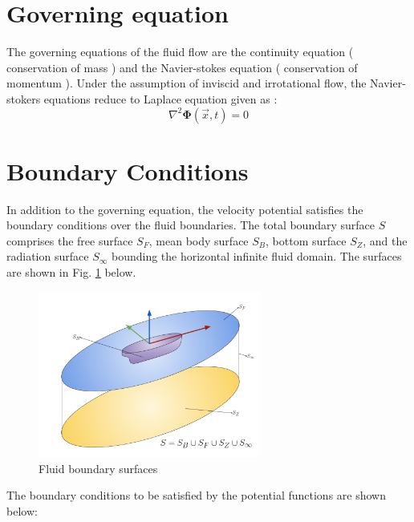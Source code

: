 \section{Governing equation}
The governing equations of the fluid flow are the continuity equation ( conservation of mass ) 
and the Navier-stokes equation ( conservation of momentum ). Under the assumption of inviscid 
and irrotational flow, the Navier-stokers equations reduce to Laplace equation given as :
\begin{equation}
    \label{eq:laplace_eq}
    \nabla^2 \boldsymbol{\Phi} (\vec{x}, t) = 0
\end{equation}

\section{Boundary Conditions}
\label{sec:Boundary condition}
In addition to the governing equation, the velocity potential satisfies the boundary 
conditions over the fluid boundaries. The total boundary surface $S$ comprises the 
free surface $S_F$, mean body surface $S_B$, bottom surface $S_Z$, and the radiation surface
 $S_\infty$ bounding the horizontal infinite fluid domain. The surfaces are shown in 
 Fig. \ref{fig:boundary_surfaces} below.
\begin{figure}[H]
	\centering
	\includegraphics[width = 0.65\textwidth]{photos/boundary_surfaces.png}
	\caption{Fluid boundary surfaces}
	\label{fig:boundary_surfaces}
\end{figure}
The boundary conditions to be satisfied by the potential functions are shown below:

